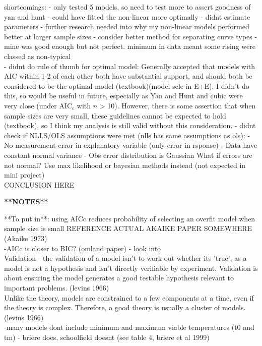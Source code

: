 \documentclass[11pt]{article}
\begin{document}
shortcomings:
- only tested 5 models, so need to test more to assert goodness of yan and hunt
- could have fitted the non-linear more optimally
- didnt estimate parameters
- further research needed into why my non-linear models performed better at larger sample sizes
- consider better method for separating curve types - mine was good enough but not perfect. minimum in data meant some rising were classed as non-typical
\\ - didnt do rule of thumb for optimal model: Generally accepted that models with AIC within 1-2 of each other both have substantial support, and should both be considered to be the optimal model (textbook)(model sele in E+E). I didn't do this, so would be useful in future, especially as Yan and Hunt and cubic were very close (under AIC$_c$ with $n$ > 10). However, there is some assertion that when sample sizes are very small, these guidelines cannot be expected to hold (textbook), so I think my analysis is still valid without this consideration.
- didnt check if NLLS/OLS assumptions were met (nlls has same assumptions as ols): 		- No measurement error in explanatory variable (only error in rsponse)
		- Data have constant normal variance
		- Obs error distribution is Gaussian
What if errors are not normal? Use max likelihood or bayesian methods instead (not expected in mini project)
\\

CONCLUSION HERE

\textbf{**NOTES**}

**To put in**: using AICc reduces probability of selecting an overfit model when sample size is small
REFERENCE ACTUAL AKAIKE PAPER SOMEWHERE (Akaike 1973)
\\

-AICc is closer to BIC? (omland paper) - look into
\\
Validation - the validation of a model isn't to work out whether its 'true', as a model is not a hypothesis and isn't directly verifiable by experiment. Validation is about ensuring the model generates a good testable hypothesis relevant to important problems. (levins 1966)
\\
Unlike the theory, models are constrained to a few components at a time, even if the theory is complex. Therefore, a good theory is usually a cluster of models. (levins 1966)
\\
-many models dont include minimum and maximum viable temperatures (t0 and tm) - briere does, schoolfield doesnt (see table 4, briere et al 1999)
\end{document}
